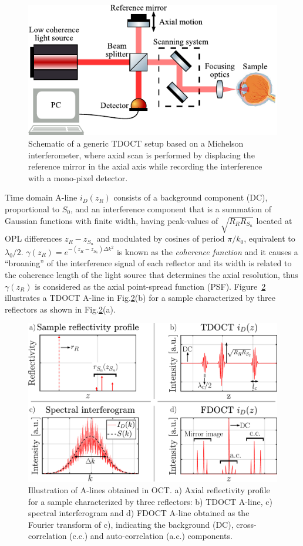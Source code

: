 \begin{figure}[htb!]
    \centering
    \includegraphics[width=.7\textwidth]{Figures/TheoreticalBasis/TDOCT_Scheme.pdf}
    \caption{Schematic of a generic TDOCT setup based on a Michelson interferometer, where axial scan is performed by displacing the reference mirror in the axial axis while recording the interference with a mono-pixel detector.}
    \label{fig:TDOCT_Scheme}
\end{figure}

Time domain A-line $i_D(z_R)$ consists of a background component (DC), proportional to $S_0$, and an interference component that is a summation of Gaussian functions with finite width, having peak-values of $\sqrt{R_RR_{S_n}}$ located at OPL differences $z_R-z_{S_n}$ and modulated by cosines of period $\pi/k_0$, equivalent to $\lambda_0/2$. $\gamma(z_R)=e^{-(z_R-z_{S_n})\Delta k^2}$ is known as the \textit{coherence function} and it causes a ``broaning'' of the interference signal of each reflector and its width is related to the coherence length of the light source that determines the axial resolution, thus $\gamma(z_R)$ is considered as the axial point-spread function (PSF). Figure~\ref{fig:Alines} illustrates a TDOCT A-line in Fig.\ref{fig:Alines}(b) for a sample characterized by three reflectors as shown in Fig.\ref{fig:Alines}(a).

\begin{figure}[htb!]
    \centering
    \includegraphics[width=.7\textwidth]{Figures/TheoreticalBasis/Alines.pdf}
    \caption{Illustration of A-lines obtained in OCT. a) Axial reflectivity profile for a sample characterized by three reflectors: b) TDOCT A-line, c) spectral interferogram and d) FDOCT A-line obtained as the Fourier transform of c), indicating the background (DC), cross-correlation (c.c.) and auto-correlation (a.c.) components.}
    \label{fig:Alines}
\end{figure}

